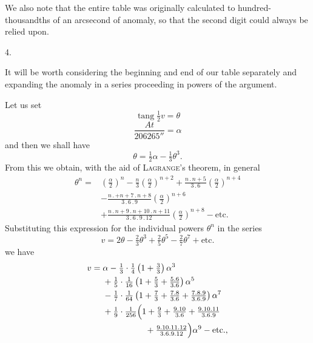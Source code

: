 \par
We also note that the entire table was originally calculated to hundred-thousandths of an arcsecond of anomaly, so that the second digit could always be relied upon.
\par\medskip
{}
\begin{center}4.\end{center}
\noindent\hspace*{\parindent}It will be worth considering the beginning and end of our table separately and expanding the anomaly in a series proceeding in powers of the argument.
\par
Let us set
\[
\operatorname{tang}\tfrac12v=\theta
\]
\[
\frac{At}{206265''}=\alpha
\]
and then we shall have
\[
\theta=\tfrac12\alpha-\tfrac13\theta^3.
\]
From this we obtain, with the aid of \textsc{Lagrange}'s theorem, in general
\[
\begin{aligned}
\theta^n={}&\left(\frac{\alpha}{2}\right)^n-\frac{n}{3}\left(\frac{\alpha}{2}\right)^{n+2}
+\frac{n\mathpunct{.}n+5}{3\mathpunct{.}6}\left(\frac{\alpha}{2}\right)^{n+4}\\
&-\frac{n\mathpunct{.}+n+7\mathpunct{.}n+8}{3\mathpunct{.}6\mathpunct{.}9}\left(\frac{\alpha}{2}\right)^{n+6}\\
&+\frac{n\mathpunct{.}n+9\mathpunct{.}n+10\mathpunct{.}n+11}{3\mathpunct{.}6\mathpunct{.}9\mathpunct{.}12}\left(\frac{\alpha}{2}\right)^{n+8}-\text{etc.}
\end{aligned}
\]
Substituting this expression for the individual powers \(\theta^n\) in the series
\[
v=2\theta-\tfrac23\theta^3+\tfrac25\theta^5-\tfrac27\theta^7+\text{etc.}
\]
we have
\[
\begin{aligned}
v={}&\alpha-\tfrac13\cdot\tfrac14\left(1+\tfrac33\right)\alpha^3\\
&+\tfrac15\cdot\tfrac1{16}\left(1+\tfrac53+\tfrac{5\mathpunct{.}6}{3\mathpunct{.}6}\right)\alpha^5\\
&-\tfrac17\cdot\tfrac1{64}\left(1+\tfrac73+\tfrac{7\mathpunct{.}8}{3\mathpunct{.}6}+\tfrac{7\mathpunct{.}8\mathpunct{.}9}{3\mathpunct{.}6\mathpunct{.}9}\right)\alpha^7\\
&+\tfrac19\cdot\tfrac1{256}\Bigl(1+\tfrac93+\tfrac{9\mathpunct{.}10}{3\mathpunct{.}6}+\tfrac{9\mathpunct{.}10\mathpunct{.}11}{3\mathpunct{.}6\mathpunct{.}9}\\
&\hspace{5em}+\tfrac{9\mathpunct{.}10\mathpunct{.}11\mathpunct{.}12}{3\mathpunct{.}6\mathpunct{.}9\mathpunct{.}12}\Bigr)\alpha^9-\text{etc.,}
\end{aligned}
\]
